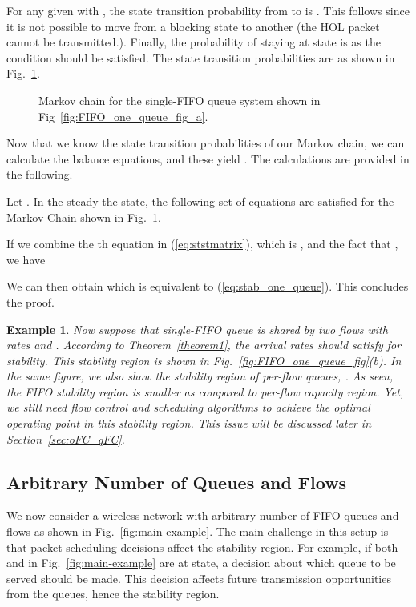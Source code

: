 \documentclass[conference]{IEEEtran}
\newtheorem{example}{Example}
\begin{document}
For any given  with , the state transition probability from  to  is . This follows since it is not possible to move from a blocking state to another (the HOL packet cannot be transmitted.). Finally, the probability of staying at state  is  as the condition  should be satisfied. The state transition probabilities are as shown in Fig.~\ref{fig:markov_chain_single_fifo}.

\begin{figure}
\vspace{5pt}
\centering
{}
\caption{Markov chain for the single-FIFO queue system shown in Fig~\ref{fig:FIFO_one_queue_fig_a}.}
\label{fig:markov_chain_single_fifo}
\vspace{-5pt}
\end{figure}

Now that we know the state transition probabilities of our Markov chain, we can calculate the balance equations, and these yield . The calculations are provided in the following. 

Let . In the steady the state, the following set of equations are satisfied for the Markov Chain shown in Fig.~\ref{fig:markov_chain_single_fifo}.  
 
If we combine the th equation in (\ref{eq:ststmatrix}), which is , and the fact that , we have


We can then obtain  which is equivalent to (\ref{eq:stab_one_queue}). This concludes the proof.
\hfill 

\begin{example}
Now suppose that single-FIFO queue  is shared by two flows with rates  and . According to Theorem~\ref{theorem1}, the arrival rates should satisfy  for stability. This stability region is shown in Fig.~\ref{fig:FIFO_one_queue_fig}(b). In the same figure, we also show the stability region of per-flow queues, \cite{neely_book}. As seen, the FIFO stability region is smaller as compared to per-flow capacity region. Yet, we still need flow control and scheduling algorithms to achieve the optimal operating point in this stability region. This issue will be discussed later in Section~\ref{sec:oFC_qFC}.
\hfill 
\end{example}

\subsection{Arbitrary Number of Queues and Flows}
We now consider a wireless network with arbitrary number of FIFO queues and flows as shown in Fig.~\ref{fig:main-example}. 
The main challenge in this setup is that packet scheduling decisions affect the stability region. 
For example, if both  and  in Fig.~\ref{fig:main-example} are at  state, a decision about which queue to be served should be made. This decision affects future transmission opportunities from the queues, hence the stability region.
\end{document}
